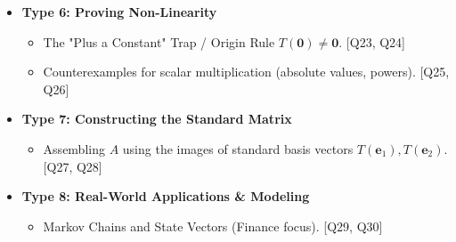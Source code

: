 \documentclass{article}
\begin{document}
\begin{itemize}
    \item \textbf{Type 6: Proving Non-Linearity}
    \begin{itemize}
        \item The "Plus a Constant" Trap / Origin Rule $T(\mathbf{0}) \neq \mathbf{0}$. [Q23, Q24]
        \item Counterexamples for scalar multiplication (absolute values, powers). [Q25, Q26]
    \end{itemize}
    
    \item \textbf{Type 7: Constructing the Standard Matrix}
    \begin{itemize}
        \item Assembling $A$ using the images of standard basis vectors $T(\mathbf{e}_1), T(\mathbf{e}_2)$. [Q27, Q28]
    \end{itemize}
    
    \item \textbf{Type 8: Real-World Applications \& Modeling}
    \begin{itemize}
        \item Markov Chains and State Vectors (Finance focus). [Q29, Q30]
    \end{itemize}
\end{itemize}
\end{document}
